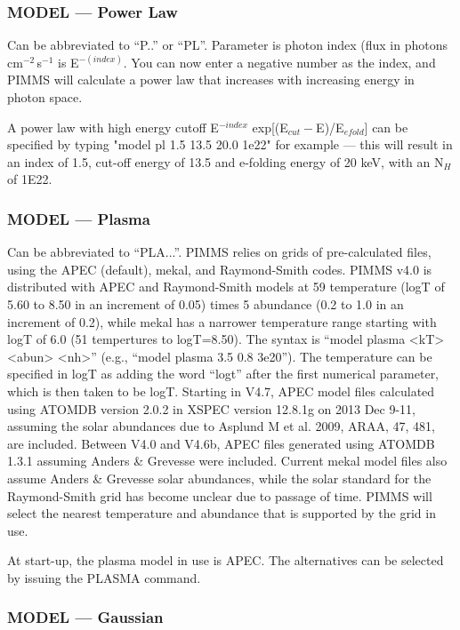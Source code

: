 \subsubsection*{MODEL --- Power Law}

Can be  abbreviated to ``P..'' or ``PL''.   Parameter is  photon index  (flux in
photons\,cm$^{-2}$\,s$^{-1}$ is E$^{-(index)}$.  You can now enter a negative
number as the index, and PIMMS will calculate a power law that increases
with increasing energy in photon space.

A power law with high energy cutoff E$^{-index}$ exp[(E$_{cut}-$E)/E$_{efold}$]
can be specified by typing "model pl 1.5 13.5 20.0 1e22" for example ---
this will result in an index of 1.5, cut-off energy of 13.5 and e-folding
energy of 20 keV, with an N$_H$ of 1E22.

\subsubsection*{MODEL --- Plasma}

Can be abbreviated to ``PLA...''.  PIMMS relies on grids of
pre-calculated files, using the APEC (default), mekal, and Raymond-Smith
codes.  PIMMS v4.0 is distributed with APEC and Raymond-Smith models at
59 temperature (logT of 5.60 to 8.50 in an increment of 0.05) times 5
abundance (0.2 to 1.0 in an increment of 0.2), while mekal has a narrower
temperature range starting with logT of 6.0 (51 tempertures to logT=8.50).
The syntax is ``model plasma <kT> <abun> <nh>'' (e.g.,
``model plasma 3.5 0.8 3e20'').
The temperature can be specified in logT as adding the word ``logt'' after
the first numerical parameter, which is then taken to be logT.  Starting in
V4.7, APEC model files calculated using ATOMDB version 2.0.2 in XSPEC
version 12.8.1g on 2013 Dec 9-11, assuming the solar abundances due to
Asplund M et al. 2009, ARAA, 47, 481, are included. Between V4.0 and V4.6b,
APEC files generated using ATOMDB 1.3.1 assuming Anders \& Grevesse were
included. Current mekal model files also assume Anders \& Grevesse solar
abundances, while the solar standard for the Raymond-Smith grid has become
unclear due to passage of time.  PIMMS will select the nearest temperature
and abundance that is supported by the grid in use.

At start-up, the plasma model in use is APEC.  The alternatives can be
selected by issuing the PLASMA command.

\subsubsection*{MODEL --- Gaussian}

